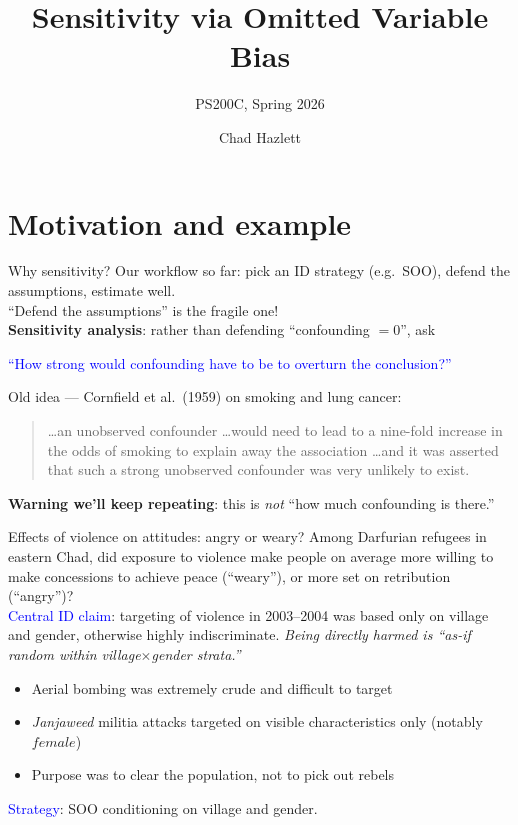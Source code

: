 \documentclass[xcolor=dvipsnames]{beamer}
\title[]{Sensitivity via Omitted Variable Bias}
\subtitle[ ]{PS200C, Spring 2026}
\author[Hazlett]{Chad Hazlett }
\institute[UCLA]{UCLA\\[1ex]
  \texttt{chazlett@ucla.edu}
}
\date{}
\begin{document}
\subject{Talks}

\begin{frame}
  \titlepage
\end{frame}


\section{Motivation and example}

\begin{frame}{Why sensitivity?}
\small
{} Our workflow so far: pick an ID strategy (e.g.\ SOO), defend the assumptions, estimate well.\\
\medskip
{} ``Defend the assumptions'' is the fragile one!\\
\medskip
{} \textbf{Sensitivity analysis}: rather than defending ``confounding $=0$'', ask
\begin{center} \textcolor{Blue}{``How strong would confounding have to be to overturn the conclusion?''} \end{center}
\medskip
{} Old idea --- Cornfield et al.\ (1959) on smoking and lung cancer:\\
\footnotesize
\begin{quote}
\dots an unobserved confounder \dots would need to lead to a nine-fold increase in the odds of smoking to explain away the association \dots and it was asserted that such a strong unobserved confounder was very unlikely to exist.
\end{quote}
\small
{} \textbf{Warning we'll keep repeating}: this is \emph{not} ``how much confounding is there.''
\end{frame}


\begin{frame}{Effects of violence on attitudes: angry or weary?}
\small
{} Among Darfurian refugees in eastern Chad, did exposure to violence make people on average more willing to make concessions to achieve peace (``weary''), or more set on retribution (``angry'')?\\
\medskip
{} \textcolor{Blue}{Central ID claim}: targeting of violence in 2003--2004 was based only on village and gender, otherwise highly indiscriminate. \emph{Being directly harmed is ``as-if random within village$\times$gender strata.''}\\
\medskip
\begin{itemize}
\item<3-> Aerial bombing was extremely crude and difficult to target
\item<4-> \textit{Janjaweed} militia attacks targeted on visible characteristics only (notably $\mathit{female}$)
\item<5-> Purpose was to clear the population, not to pick out rebels
\end{itemize}
\medskip
{} \textcolor{Blue}{Strategy}: SOO conditioning on village and gender.
\end{frame}
\end{document}
